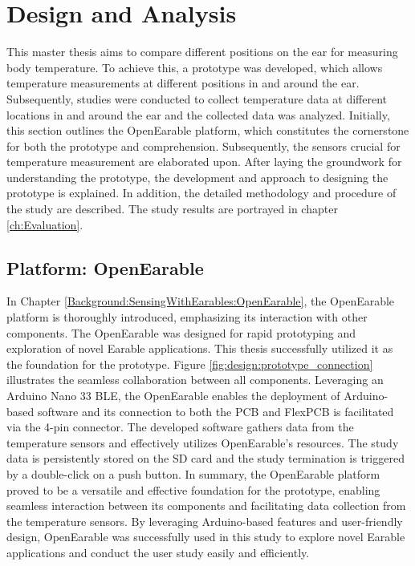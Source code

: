 \chapter{Design and Analysis}
\label{ch:Design}
This master thesis aims to compare different positions on the ear for measuring body temperature. 
To achieve this, a prototype was developed, which allows temperature measurements at different positions in and around the ear. 
Subsequently, studies were conducted to collect temperature data at different locations in and around the ear and the collected data was analyzed.
Initially, this section outlines the OpenEarable platform, which constitutes the cornerstone for both the prototype and comprehension. 
Subsequently, the sensors crucial for temperature measurement are elaborated upon.
After laying the groundwork for understanding the prototype, the development and approach to designing the prototype is explained.
In addition, the detailed methodology and procedure of the study are described.
The study results are portrayed in chapter \ref{ch:Evaluation}.

\section{Platform: OpenEarable}
\label{ch:Design:Prototype:OpenEarable}
In Chapter \ref{Background:SensingWithEarables:OpenEarable}, the OpenEarable platform is thoroughly introduced, emphasizing its interaction with other components. 
The OpenEarable was designed for rapid prototyping and exploration of novel Earable applications.
This thesis successfully utilized it as the foundation for the prototype. 
Figure \ref{fig:design:prototype_connection} illustrates the seamless collaboration between all components. 
Leveraging an Arduino Nano 33 BLE, the OpenEarable enables the deployment of Arduino-based software and its connection to both the PCB and FlexPCB is facilitated via the 4-pin connector. 
The developed software gathers data from the temperature sensors and effectively utilizes OpenEarable's resources. 
The study data is persistently stored on the SD card and the study termination is triggered by a double-click on a push button.
In summary, the OpenEarable platform proved to be a versatile and effective foundation for the prototype, enabling seamless interaction between its components and facilitating data collection from the temperature sensors. 
By leveraging Arduino-based features and user-friendly design, OpenEarable was successfully used in this study to explore novel Earable applications and conduct the user study easily and efficiently.

